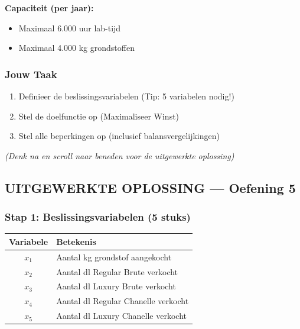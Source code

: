 \documentclass[a4paper,11pt]{article}
\begin{document}
\begin{oefenblok}
    \textbf{Capaciteit (per jaar):}
    \begin{itemize}
        \item Maximaal 6.000 uur lab-tijd
        \item Maximaal 4.000 kg grondstoffen
    \end{itemize}

    \subsubsection*{Jouw Taak}
    \begin{enumerate}
        \item Definieer de beslissingsvariabelen (Tip: 5 variabelen nodig!)
        \item Stel de doelfunctie op (Maximaliseer Winst)
        \item Stel alle beperkingen op (inclusief balansvergelijkingen)
    \end{enumerate}

    \vspace{0.3cm}
    \textit{(Denk na en scroll naar beneden voor de uitgewerkte oplossing)}


    \subsection*{UITGEWERKTE OPLOSSING — Oefening 5}

    \subsubsection*{Stap 1: Beslissingsvariabelen (5 stuks)}

    \begin{center}
        \begin{tabular}{|c|l|}
            \hline
            \textbf{Variabele} & \textbf{Betekenis}                  \\
            \hline
            $x_1$              & Aantal kg grondstof aangekocht      \\
            \hline
            $x_2$              & Aantal dl Regular Brute verkocht    \\
            \hline
            $x_3$              & Aantal dl Luxury Brute verkocht     \\
            \hline
            $x_4$              & Aantal dl Regular Chanelle verkocht \\
            \hline
            $x_5$              & Aantal dl Luxury Chanelle verkocht  \\
            \hline
        \end{tabular}
    \end{center}


\end{oefenblok}
\end{document}
